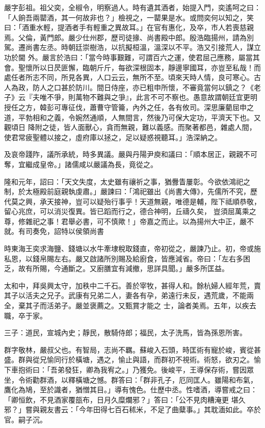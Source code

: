 \begin{pinyinscope}
 嚴字彭祖。祖父奕，全椒令，明察過人。時有遺其酒者，始提入門，奕遙呵之曰：「人餉吾兩罌酒，其一何故非也？」檢視之，一罌果是水。或問奕何以知之，笑曰：「酒重水輕，提酒者手有輕重之異故耳。」在官有惠化，及卒，市人若喪慈親焉。父倫，黃門郎。嚴少仕州郡，歷司徒掾、尚書殿中郎。殷浩臨揚州，請為別駕。遷尚書左丞。時朝廷崇樹浩，以抗擬桓溫，溫深以不平。浩又引接荒人，謀立功於閫
 外。嚴言於浩曰：「當今時事艱難，可謂百六之運，使君屈己應務，屬當其會。聖懷所以日昃匪懈，臨朝斤斤，每欲深根固本，靜邊寧國耳，亦豈至私哉！而處任者所志不同，所見各異，人口云云，無所不至。頃來天時人情，良可寒心。古人為政，防人之口甚於防川。間日侍座，亦已粗申所懷，不審竟當何以鎮之？《老子》云『夫唯不爭，則萬物不難與之爭』，此言不可不察也。愚意故謂朝廷宜更明授任之方，韓彭可專征伐，蕭曹守管籥，內外之任，各有攸司。深思廉藺屈申之道，平勃相和之義，令婉然通順，人無間言，然後乃可保大定功，平濟天下也。又觀頃日
 降附之徒，皆人面獸心，貪而無親，難以義感。而聚著都邑，雜處人間，使君常疲聖體以接之，虛府庫以拯之，足以疑惑視聽耳。」浩深納之。



 及哀帝踐阼，議所承統，時多異議。嚴與丹陽尹庾和議曰：「順本居正，親親不可奪，宜繼成皇帝。」諸儒咸以嚴議為長，竟從之。



 隆和元年，詔曰：「天文失度，太史雖有禳祈之事，猶釁眚屢彰。今欲依鴻祀之制，於太極殿前庭親執虔肅。」嚴諫曰：「鴻祀雖出《尚書大傳》，先儒所不究，歷代莫之興，承天接神，豈可以疑殆行事乎！天道無親，唯德是輔，陛下祗順恭敬，留心兆庶，可以消災復異。皆已蹈而行之，德合神明，丘禱久矣，
 豈須屈萬乘之尊，修雜祀之事！君舉必書，可不慎歟！」帝嘉之而止。以為揚州大中正，嚴不就。有司奏免，詔特以侯領尚書



 時東海王奕求海鹽、錢塘以水牛牽埭稅取錢直，帝初從之，嚴諫乃止。初，帝或施私恩，以錢帛賜左右。嚴又啟諸所別賜及給廚食，皆應減省。帝曰：「左右多困乏，故有所賜，今通斷之。又廚膳宜有減撤，思詳具聞。」嚴多所匡益。



 太和中，拜吳興太守，加秩中二千石。善於宰牧，甚得人和。餘杭婦人經年荒，賣其子以活夫之兄子。武康有兄弟二人，妻各有孕，弟遠行未反，遇荒歲，不能兩全，棄其子而活弟子。嚴並褒薦之。又甄賞才能之
 士，論者美焉。五年，以疾去職，卒于家。



 三子：道民，宣城內史；靜民，散騎侍郎；福民，太子洗馬，皆為孫恩所害。



 群字敬林，嚴叔父也。有智局，志尚不羈。蘇峻入石頭，時匡術有寵於峻，賓從甚盛。群與從兄愉同行於橫塘，遇之，愉止與語，而群初不視術。術怒，欲刃之。愉下車抱術曰：「吾弟發狂，卿為我宥之。」乃獲免。後峻平，王導保存術，嘗因眾坐，令術勸群酒，以釋橫塘之憾。群答曰：「群非孔子，厄同匡人。雖陽和布氣，鷹化為鳩，至於識者，猶憎其目。」導有愧色。仕歷中丞。性嗜酒，導嘗戒之曰：「卿恒飲，不見酒家覆瓿布，日月久糜爛邪？」答曰：「公不見肉糟淹更
 堪久邪？」嘗與親友書云：「今年田得七百石秫米，不足了曲糵事。」其耽湎如此。卒於官。嗣子沉。




\end{pinyinscope}

